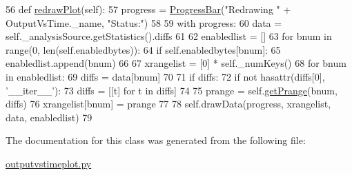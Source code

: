 \begin{DoxyCode}
56     \textcolor{keyword}{def }\hyperlink{classsoftware_1_1chipwhisperer_1_1common_1_1results_1_1outputvstimeplot_1_1OutputVsTime_a3092d300cb50918e38b826435898b961}{redrawPlot}(self):
57         progress = \hyperlink{namespacesoftware_1_1chipwhisperer_1_1common_1_1ui_1_1ProgressBar_a378a399b50b3d116fc08a53eaa642148}{ProgressBar}(\textcolor{stringliteral}{"Redrawing "} + OutputVsTime.\_name, \textcolor{stringliteral}{"Status:"})
58 
59         with progress:
60             data = self.\_analysisSource.getStatistics().diffs
61 
62             enabledlist = []
63             \textcolor{keywordflow}{for} bnum \textcolor{keywordflow}{in} range(0, len(self.enabledbytes)):
64                 \textcolor{keywordflow}{if} self.enabledbytes[bnum]:
65                     enabledlist.append(bnum)
66 
67             xrangelist = [0] * self.\_numKeys()
68             \textcolor{keywordflow}{for} bnum \textcolor{keywordflow}{in} enabledlist:
69                 diffs = data[bnum]
70 
71                 \textcolor{keywordflow}{if} diffs:
72                     \textcolor{keywordflow}{if} \textcolor{keywordflow}{not} hasattr(diffs[0], \textcolor{stringliteral}{'\_\_iter\_\_'}):
73                         diffs = [[t] \textcolor{keywordflow}{for} t \textcolor{keywordflow}{in} diffs]
74 
75                     prange = self.\hyperlink{classsoftware_1_1chipwhisperer_1_1common_1_1results_1_1outputvstimeplot_1_1OutputVsTime_a6d4112ef06f838b7fc31694febaae29a}{getPrange}(bnum, diffs)
76                     xrangelist[bnum] = prange
77 
78             self.drawData(progress, xrangelist, data, enabledlist)
79 \end{DoxyCode}


The documentation for this class was generated from the following file\+:\begin{DoxyCompactItemize}
\item 
\hyperlink{outputvstimeplot_8py}{outputvstimeplot.\+py}\end{DoxyCompactItemize}

